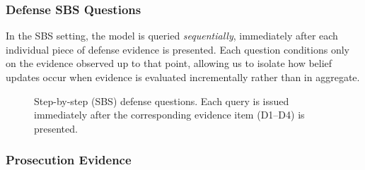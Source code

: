 \documentclass[11pt, letterpaper]{article}
\begin{document}
\subsubsection{Defense SBS Questions}

In the SBS setting, the model is queried \emph{sequentially}, immediately after each individual piece of defense evidence is presented. Each question conditions only on the evidence observed up to that point, allowing us to isolate how belief updates occur when evidence is evaluated incrementally rather than in aggregate.

\begin{figure}[ht!]
\centering
{}
\caption{Step-by-step (SBS) defense questions. Each query is issued immediately after the corresponding evidence item (D1–D4) is presented.}
\label{fig:criminal_defense_sbs}
\end{figure}




\subsubsection{Prosecution Evidence}
\end{document}
